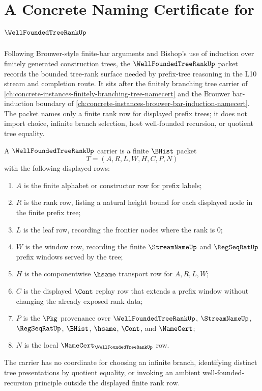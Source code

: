 \chapter{A Concrete Naming Certificate for $\WellFoundedTreeRankUp$}
\label{ch:concrete-instances-well-founded-tree-rank-namecert}

Following Brouwer-style finite-bar arguments and Bishop's use of induction over finitely generated construction trees, the $\WellFoundedTreeRankUp$ packet records the bounded tree-rank surface needed by prefix-tree reasoning in the L10 stream and completion route. It sits after the finitely branching tree carrier of \autoref{ch:concrete-instances-finitely-branching-tree-namecert} and the Brouwer bar-induction boundary of \autoref{ch:concrete-instances-brouwer-bar-induction-namecert}. The packet names only a finite rank row for displayed prefix trees; it does not import choice, infinite branch selection, host well-founded recursion, or quotient tree equality.

\begin{definition}
\label{def:well-founded-tree-rank-carrier}
A $\WellFoundedTreeRankUp$ carrier is a finite $\BHist$ packet
$$
T=(A,R,L,W,H,C,P,N)
$$
with the following displayed rows:
\begin{enumerate}
\item $A$ is the finite alphabet or constructor row for prefix labels;
\item $R$ is the rank row, listing a natural height bound for each displayed node in the finite prefix tree;
\item $L$ is the leaf row, recording the frontier nodes where the rank is $0$;
\item $W$ is the window row, recording the finite $\StreamNameUp$ and $\RegSeqRatUp$ prefix windows served by the tree;
\item $H$ is the componentwise $\hsame$ transport row for $A,R,L,W$;
\item $C$ is the displayed $\Cont$ replay row that extends a prefix window without changing the already exposed rank data;
\item $P$ is the $\Pkg$ provenance over $\WellFoundedTreeRankUp$, $\StreamNameUp$, $\RegSeqRatUp$, $\BHist$, $\hsame$, $\Cont$, and $\NameCert$;
\item $N$ is the local $\NameCert_{\WellFoundedTreeRankUp}$ row.
\end{enumerate}
The carrier has no coordinate for choosing an infinite branch, identifying distinct tree presentations by quotient equality, or invoking an ambient well-founded-recursion principle outside the displayed finite rank row.
\end{definition}

